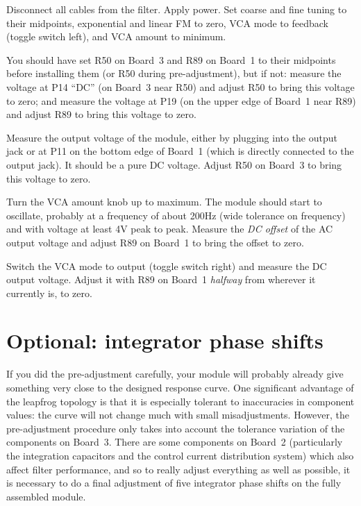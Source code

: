 Disconnect all cables from the filter.  Apply power.  Set coarse and fine
tuning to their midpoints, exponential and linear FM to zero, VCA mode to
feedback (toggle switch left), and VCA amount to minimum.

You should have set R50 on Board~3 and R89 on Board~1 to their midpoints
before installing them (or R50 during pre-adjustment), but if not: measure
the voltage at P14 ``DC'' (on Board~3 near R50) and adjust R50 to bring this
voltage to zero; and measure the voltage at P19 (on the upper edge of
Board~1 near R89) and adjust R89 to bring this voltage to zero.

Measure the output voltage of the module, either by plugging into the output
jack or at P11 on the bottom edge of Board~1 (which is directly connected to
the output jack).  It should be a pure DC voltage.  Adjust R50 on Board~3 to
bring this voltage to zero.

Turn the VCA amount knob up to maximum.  The module should start to
oscillate, probably at a frequency of about 200Hz (wide tolerance on
frequency) and with voltage at least 4V peak to peak.  Measure the \emph{DC
offset} of the AC output voltage and adjust R89 on Board~1 to bring the
offset to zero.

Switch the VCA mode to output (toggle switch right) and measure the DC
output voltage.  Adjust it with R89 on Board~1 \emph{halfway} from wherever
it currently is, to zero.

\section{Optional: integrator phase shifts}

If you did the pre-adjustment carefully, your module will probably already
give something very close to the designed response curve.  One significant
advantage of the leapfrog topology is that it is especially tolerant to
inaccuracies in component values: the curve will not change much with small
misadjustments.  However, the pre-adjustment procedure only takes into
account the tolerance variation of the components on Board~3.  There are
some components on Board~2 (particularly the integration capacitors and the
control current distribution system) which also affect filter performance,
and so to really adjust everything as well as possible, it is necessary to
do a final adjustment of five integrator phase shifts on the fully
assembled module.

